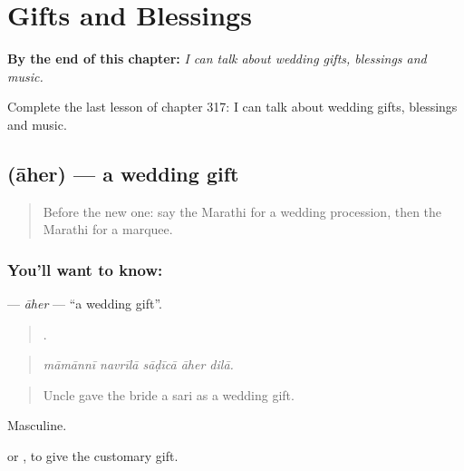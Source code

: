 
\chapter{Gifts and Blessings}
\label{ch:mr-gifts-and-blessings}

\begin{chapteropening}
\textbf{By the end of this chapter:} \emph{I can talk about wedding gifts, blessings and music.}

Complete the last lesson of chapter 317: I can talk about wedding gifts, blessings and music.
\end{chapteropening}

\section[\texorpdfstring{\mr{आहेर} (āher)}{आहेर (āher)}]{ (āher) — a wedding gift}

\label{lesson:MR-C317-aher}



\begin{quote}
Before the new one: say the Marathi for a wedding procession, then the Marathi for a marquee.
\end{quote}

\subsection*{You'll want to know: }
\textbf{} — \emph{āher} — \textquotedblleft{}a wedding gift\textquotedblright{}.

\begin{quote}
    .
\end{quote}

\begin{quote}
\emph{māmānnī navrīlā sāḍīcā āher dilā.}
\end{quote}

\begin{quote}
Uncle gave the bride a sari as a wedding gift.
\end{quote}

Masculine.

  or , to give the customary gift.

